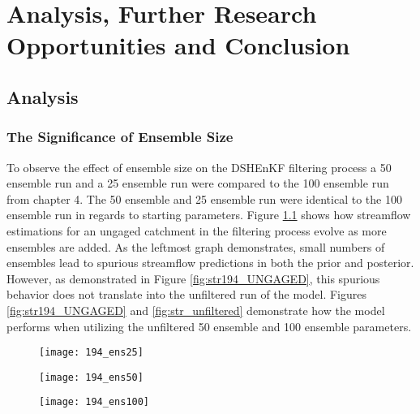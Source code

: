 \chapter{Analysis, Further Research Opportunities and Conclusion}

\section{Analysis}

\subsection{The Significance of Ensemble Size}

To observe the effect of ensemble size on the DSHEnKF filtering process a 50 ensemble run and a 25 ensemble run were compared to the 100 ensemble run from chapter 4. The 50 ensemble and 25 ensemble run were identical to the 100 ensemble run in regards to starting parameters. Figure \ref{fig:194_ens} shows how streamflow estimations for an ungaged catchment in the filtering process evolve as more ensembles are added. As the leftmost graph demonstrates, small numbers of ensembles lead to spurious streamflow predictions in both the prior and posterior. However, as demonstrated in Figure \ref{fig:str194_UNGAGED}, this spurious behavior does not translate into the unfiltered run of the model. Figures \ref{fig:str194_UNGAGED} and \ref{fig:str_unfiltered} demonstrate how the model performs when utilizing the unfiltered 50 ensemble and 100 ensemble parameters.

\begin{figure}
\centering
\begin{minipage}{.33\textwidth}
  \centering
  \texttt{[image: 194\_ens25]}
  \label{fig:194_ens25}
\end{minipage}%
\begin{minipage}{.33\textwidth}
  \centering
  \texttt{[image: 194\_ens50]}
  \label{fig:194_ens50}
\end{minipage}
\begin{minipage}{.33\textwidth}
  \centering
  \texttt{[image: 194\_ens100]}
  \label{fig:194_ens100}
\end{minipage}
\label{fig:194_ens}
\end{figure}

